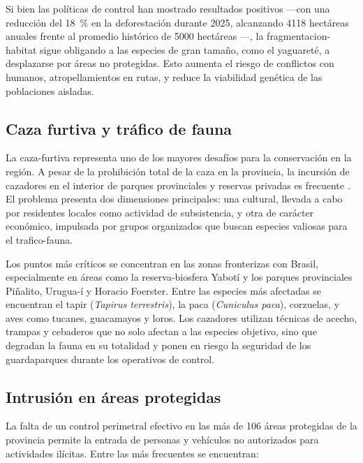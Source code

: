 \documentclass[a4paper, 12pt]{report}
\begin{document}
Si bien las políticas de control han mostrado resultados positivos ---con una
reducción del \qty{18}{\percent} en la deforestación durante 2025, alcanzando \num{4118} hectáreas
anuales frente al promedio histórico de \num{5000} hectáreas
\cite{ecologiamisiones2025deforestacion}---, la \gls{fragmentacion-habitat}
sigue obligando a las especies de gran tamaño, como el yaguareté, a desplazarse
por áreas no protegidas. Esto aumenta el riesgo de conflictos con humanos,
atropellamientos en rutas, y reduce la viabilidad genética de las poblaciones
aisladas.

\subsection{Caza furtiva y tráfico de fauna}

La \gls{caza-furtiva} representa uno de los mayores desafíos para la
conservación en la región. A pesar de la prohibición total de la caza en la
provincia, la incursión de cazadores en el interior de parques provinciales
y reservas privadas es frecuente \cite{ecologiamisiones2024cazafurtiva}. El
problema presenta dos dimensiones principales: una cultural, llevada a cabo
por residentes locales como actividad de subsistencia, y otra de carácter
económico, impulsada por grupos organizados que buscan especies valiosas
para el \gls{trafico-fauna}.

Los puntos más críticos se concentran en las zonas fronterizas con Brasil,
especialmente en áreas como la \gls{reserva-biosfera} Yabotí y los parques
provinciales Piñalito, Urugua-í y Horacio Foerster. Entre las especies más
afectadas se encuentran el tapir (\textit{Tapirus terrestris}), la paca
(\textit{Cuniculus paca}), corzuelas, y aves como tucanes, guacamayos y loros.
Los cazadores utilizan técnicas de acecho, trampas y cebaderos que no solo
afectan a las especies objetivo, sino que degradan la fauna en su totalidad
y ponen en riesgo la seguridad de los guardaparques durante los operativos
de control.

\subsection{Intrusión en áreas protegidas}

La falta de un control perimetral efectivo en las más de 106 áreas protegidas
de la provincia permite la entrada de personas y vehículos no autorizados para
actividades ilícitas. Entre las más frecuentes se encuentran:
\end{document}
